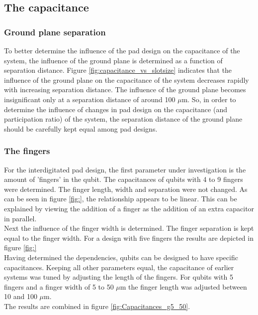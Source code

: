 \subsection{The capacitance} 
\subsubsection{Ground plane separation}
To better determine the influence of the pad design on the capacitance of the system, the influence of the ground plane is determined as a function of separation distance. Figure \ref{fig:capacitance_vs_slotsize} indicates that the influence of the ground plane on the capacitance of the system decreases rapidly with increasing separation distance. The influence of the ground plane becomes insignificant only at a separation distance of around 100 \(\mu\)m. So, in order to determine the influence of changes in pad design on the capacitance (and participation ratio) of the system, the separation distance of the ground plane should be carefully kept equal among pad designs.  

\subsubsection{The fingers}
For the interdigitated pad design, the first parameter under investigation is the amount of 'fingers' in the  qubit. The capacitances of qubits with 4 to 9 fingers were determined. The finger length, width and separation were not changed.
As can be seen in figure \ref{fig:}, the relationship appears to be linear. This can be explained by viewing the addition of a finger as the addition of an extra capacitor in parallel.\\
Next the influence of the finger width is determined. The finger separation is kept equal to the finger width. For a design with five fingers the results are depicted in figure \ref{fig:} \\

Having determined the dependencies, qubits can be designed to have specific capacitances. Keeping all other parameters equal, the capacitance of earlier systems was tuned by adjusting the length of the fingers. For qubits with 5 fingers and a finger width of 5 to 50 \(\mu\)m the finger length was adjusted between 10 and 100 \(\mu\)m. \\
The results are combined in figure \ref{fig:Capacitances_g5_50}.

